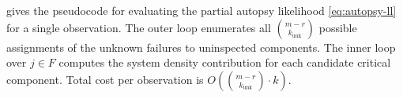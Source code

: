 \documentclass[12pt]{article}
\begin{document}
 gives the pseudocode for evaluating the partial
autopsy likelihood \eqref{eq:autopsy-ll} for a single observation.  The
outer loop enumerates all $\binom{m-r}{k_{\text{unk}}}$ possible
assignments of the unknown failures to uninspected components.  The inner
loop over $j \in F$ computes the system density contribution for each
candidate critical component.  Total cost per observation is
$O(\binom{m-r}{k_{\text{unk}}} \cdot k)$.




\end{document}
